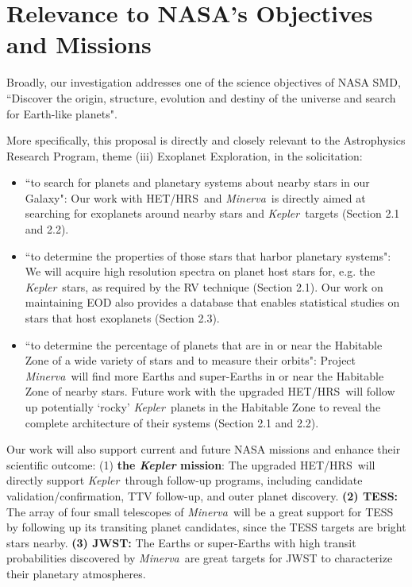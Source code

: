 \documentclass[12pt]{article}
\def\kepler{{\it Kepler}}
\def\minerva{{\it Minerva}}
\def\hrs{HET/HRS}
\begin{document}
 
\vspace{-3pt}
\section{Relevance to NASA's Objectives and Missions}

Broadly, our investigation addresses one of the science
objectives of NASA SMD, ``Discover the origin, structure, evolution
and destiny of the universe and search for Earth-like planets".

More specifically, this proposal is directly and closely relevant to
the Astrophysics Research Program, theme (iii) Exoplanet Exploration,
in the solicitation:
\begin{itemize}[leftmargin=1.5em]
  \vspace{-3pt}
\item ``to search for planets and planetary systems about
  nearby stars in our Galaxy": Our work with \hrs\ and
  \minerva\ is directly aimed at searching for exoplanets
  around nearby stars and \kepler\ targets (Section 2.1
  and 2.2).
  \vspace{-3pt}
\item ``to determine the properties of those stars that harbor
  planetary systems": We will acquire high resolution spectra
  on planet host stars for, e.g. the \kepler\ stars, as
  required by the RV technique (Section 2.1). Our work on
  maintaining EOD also provides a database that enables
  statistical studies on stars that host exoplanets (Section
  2.3).
  \vspace{-3pt}
\item ``to determine the percentage of planets that are in or near the
  Habitable Zone of a wide variety of stars and to measure their
  orbits": Project \minerva\ will find more Earths and super-Earths in
  or near the Habitable Zone of nearby stars. Future work with the
  upgraded \hrs\ will follow up potentially `rocky' \kepler\ planets
  in the Habitable Zone to reveal the complete architecture of their
  systems (Section 2.1 and 2.2).
  \vspace{-3pt}
\end{itemize}

Our work will also support current and future NASA missions and
enhance their scientific outcome: (1) {\bf the \textit{Kepler}
  mission}: The upgraded \hrs\ will directly support \kepler\ through
follow-up programs, including candidate validation/confirmation, TTV
follow-up, and outer planet discovery. {\bf (2) TESS:} The array of
four small telescopes of \minerva\ will be a great support for TESS by
following up its transiting planet candidates, since the TESS targets
are bright stars nearby. {\bf (3) JWST:} The Earths or super-Earths
with high transit probabilities discovered by \minerva\ are great
targets for JWST to characterize their planetary atmospheres.
\end{document}
